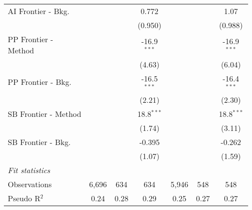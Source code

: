 \begin{tabular}{lcccccc}
   AI Frontier - Bkg.   &               &               & 0.772         &              &               & 1.07\\   
                        &               &               & (0.950)       &              &               & (0.988)\\   
   PP Frontier - Method &               &               & -16.9$^{***}$ &              &               & -16.9$^{***}$\\   
                        &               &               & (4.63)        &              &               & (6.04)\\   
   PP Frontier - Bkg.   &               &               & -16.5$^{***}$ &              &               & -16.4$^{***}$\\   
                        &               &               & (2.21)        &              &               & (2.30)\\   
   SB Frontier - Method &               &               & 18.8$^{***}$  &              &               & 18.8$^{***}$\\   
                        &               &               & (1.74)        &              &               & (3.11)\\   
   SB Frontier - Bkg.   &               &               & -0.395        &              &               & -0.262\\   
                        &               &               & (1.07)        &              &               & (1.59)\\   
   \midrule
   \emph{Fit statistics}\\
   Observations         & 6,696         & 634           & 634           & 5,946        & 548           & 548\\  
   Pseudo R$^2$         & 0.24          & 0.28          & 0.29          & 0.25         & 0.27          & 0.27\\  
   

\end{tabular}
